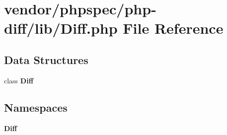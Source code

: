 \section{vendor/phpspec/php-\/diff/lib/\+Diff.php File Reference}
\label{phpspec_2php-diff_2lib_2_diff_8php}
\subsection*{Data Structures}
\begin{DoxyCompactItemize}
\item 
class {\bf Diff}
\end{DoxyCompactItemize}
\subsection*{Namespaces}
\begin{DoxyCompactItemize}
\item 
 {\bf Diff}
\end{DoxyCompactItemize}
